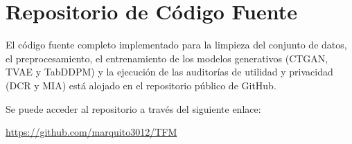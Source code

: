 \section{Repositorio de Código Fuente}

El código fuente completo implementado para la limpieza del conjunto de datos, el preprocesamiento, el entrenamiento de los modelos generativos (CTGAN, TVAE y TabDDPM) y la ejecución de las auditorías de utilidad y privacidad (DCR y MIA) está alojado en el repositorio público de GitHub.

Se puede acceder al repositorio a través del siguiente enlace:
\begin{center}
    \url{https://github.com/marquito3012/TFM}
\end{center}
